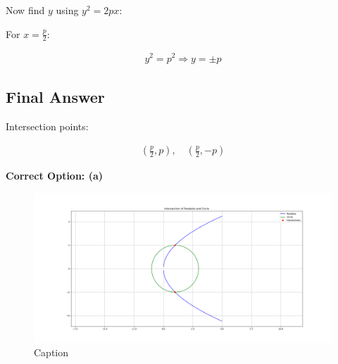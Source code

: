 \documentclass{article}
\begin{document}
Now find $y$ using $y^2 = 2px$:

For $x = \frac{p}{2}$:


\begin{align}
y^2 = p^2 \Rightarrow y = \pm p
\end{align}



\subsection*{Final Answer}

Intersection points:


\begin{align}
(\frac{p}{2}, p), \quad (\frac{p}{2}, -p)
\end{align}


\textbf{Correct Option: (a)}

\begin{figure}[H]
    \centering
    \includegraphics[width=0.8\linewidth]{./figs/Figure_1.png}
    \caption{Caption}
    \label{fig:placeholder}
\end{figure}
\end{document}

